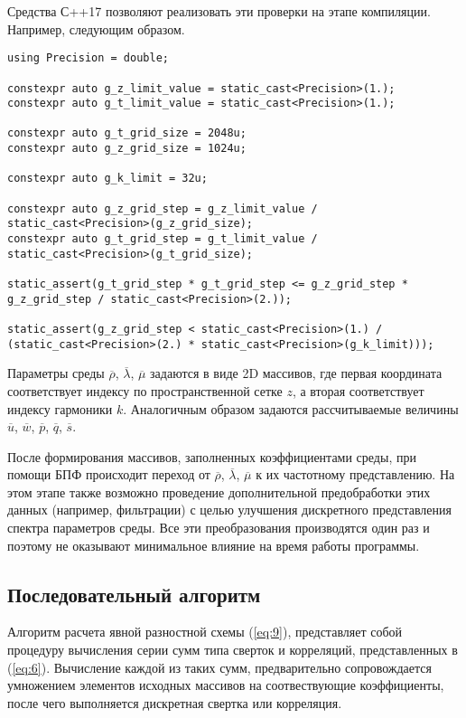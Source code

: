 Средства С++17 позволяют реализовать эти проверки на этапе компиляции. Например, следующим образом.

\begin{lstlisting}[style={CppCodeStyle}]
using Precision = double;

constexpr auto g_z_limit_value = static_cast<Precision>(1.);
constexpr auto g_t_limit_value = static_cast<Precision>(1.);

constexpr auto g_t_grid_size = 2048u;
constexpr auto g_z_grid_size = 1024u;

constexpr auto g_k_limit = 32u;

constexpr auto g_z_grid_step = g_z_limit_value / static_cast<Precision>(g_z_grid_size);
constexpr auto g_t_grid_step = g_t_limit_value / static_cast<Precision>(g_t_grid_size);

static_assert(g_t_grid_step * g_t_grid_step <= g_z_grid_step * g_z_grid_step / static_cast<Precision>(2.));

static_assert(g_z_grid_step < static_cast<Precision>(1.) / (static_cast<Precision>(2.) * static_cast<Precision>(g_k_limit)));
\end{lstlisting}

Параметры среды $\overline\rho$, $\overline\lambda$, $\overline\mu$ задаются в виде 2D массивов, 
где первая координата соответствует индексу по пространственной сетке $z$, а вторая соответствует индексу гармоники $k$.
Аналогичным образом задаются рассчитываемые величины $\overline u$, $\overline w$, $\overline p$, $\overline q$, $\overline s$.

После формирования массивов, заполненных коэффициентами среды, при помощи БПФ происходит переход от $\overline\rho$, $\overline\lambda$, $\overline\mu$ к их частотному представлению. На этом этапе также возможно проведение дополнительной предобработки этих данных (например, фильтрации) с целью улучшения дискретного представления спектра параметров среды. Все эти преобразования производятся один раз и поэтому не оказывают минимальное влияние на время работы программы. 

\subsection{Последовательный алгоритм}

Алгоритм расчета явной разностной схемы (\ref{eq:9}), представляет собой процедуру вычисления серии сумм типа сверток и корреляций,
представленных в (\ref{eq:6}). Вычисление каждой из таких сумм, предварительно сопровождается умножением элементов исходных 
массивов на соотвествующие коэффициенты, после чего выполняется дискретная свертка или корреляция.

